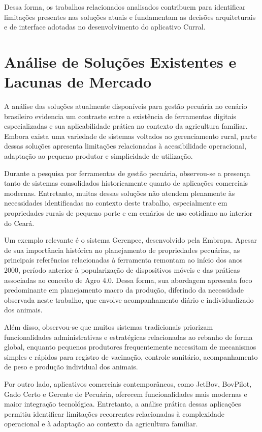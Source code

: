 Dessa forma, os trabalhos relacionados analisados contribuem para identificar limitações presentes nas soluções atuais e fundamentam as decisões arquiteturais e de interface adotadas no desenvolvimento do aplicativo Curral.
\section{Análise de Soluções Existentes e Lacunas de Mercado}
\label{sec:lacunas-mercado}

A análise das soluções atualmente disponíveis para gestão pecuária no cenário brasileiro evidencia um contraste entre a existência de ferramentas digitais especializadas e sua aplicabilidade prática no contexto da agricultura familiar. Embora exista uma variedade de sistemas voltados ao gerenciamento rural, parte dessas soluções apresenta limitações relacionadas à acessibilidade operacional, adaptação ao pequeno produtor e simplicidade de utilização.

Durante a pesquisa por ferramentas de gestão pecuária, observou-se a presença tanto de sistemas consolidados historicamente quanto de aplicações comerciais modernas. Entretanto, muitas dessas soluções não atendem plenamente às necessidades identificadas no contexto deste trabalho, especialmente em propriedades rurais de pequeno porte e em cenários de uso cotidiano no interior do Ceará.

Um exemplo relevante é o sistema Gerenpec, desenvolvido pela Embrapa. Apesar de sua importância histórica no planejamento de propriedades pecuárias, as principais referências relacionadas à ferramenta remontam ao início dos anos 2000, período anterior à popularização de dispositivos móveis e das práticas associadas ao conceito de Agro 4.0. Dessa forma, sua abordagem apresenta foco predominante em planejamento macro da produção, diferindo da necessidade observada neste trabalho, que envolve acompanhamento diário e individualizado dos animais.

Além disso, observou-se que muitos sistemas tradicionais priorizam funcionalidades administrativas e estratégicas relacionadas ao rebanho de forma global, enquanto pequenos produtores frequentemente necessitam de mecanismos simples e rápidos para registro de vacinação, controle sanitário, acompanhamento de peso e produção individual dos animais.

Por outro lado, aplicativos comerciais contemporâneos, como JetBov, BovPilot, Gado Certo e Gerente de Pecuária, oferecem funcionalidades mais modernas e maior integração tecnológica. Entretanto, a análise prática dessas aplicações permitiu identificar limitações recorrentes relacionadas à complexidade operacional e à adaptação ao contexto da agricultura familiar.

